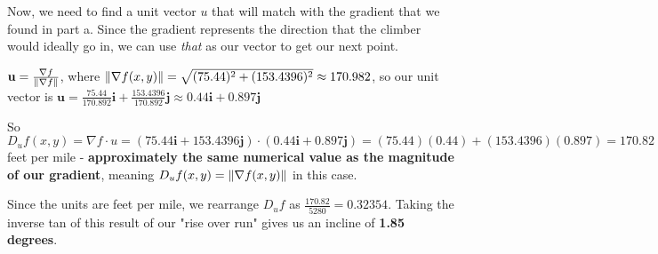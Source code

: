 \documentclass{article}
\begin{document}




\par\noindent\Large Now, we need to find a unit vector $u$ that will match with the gradient that we found in part a.  Since the gradient represents the direction that the climber would ideally go in, we can use \textit{that} as our vector to get our next point.\vspace{0.25cm}

\par\noindent\Large $\textbf{u} = \frac{\nabla f}{\norm{\nabla f}}$, where $\norm{\nabla f(x, y)} = \sqrt{(75.44)^{2} + (153.4396)^{2}} \approx 170.982$, so our unit vector is $\textbf{u} = \frac{75.44}{170.892}\textbf{i} + \frac{153.4396}{170.892}\textbf{j} \approx 0.44\textbf{i} + 0.897\textbf{j}$\vspace{0.25cm}

\par\noindent\Large So $D_{u}f(x, y) = \nabla f \cdot u = (75.44\textbf{i} + 153.4396\textbf{j}) \cdot (0.44\textbf{i} + 0.897\textbf{j}) = (75.44)(0.44) + (153.4396)(0.897) = 170.82$ feet per mile - \textbf{approximately the same numerical value as the magnitude of our gradient}, meaning $D_{u}f(x, y) = \norm{\nabla f(x, y)}$ in this case.\vspace{0.25cm}


\par\noindent\Large Since the units are feet per mile, we rearrange $D_{u}f$ as $\frac{170.82}{5280} = 0.32354$.  Taking the inverse tan of this result of our "rise over run" gives us an incline of \textbf{1.85 degrees}.
\end{document}
